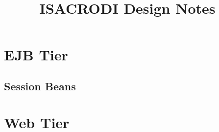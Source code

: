 \documentclass[a4paper,fleqn]{article}
\begin{document}
\title{ISACRODI Design Notes}
\author{}
\maketitle

\section{EJB Tier}

\subsection{Session Beans}

\section{Web Tier}
\end{document}
